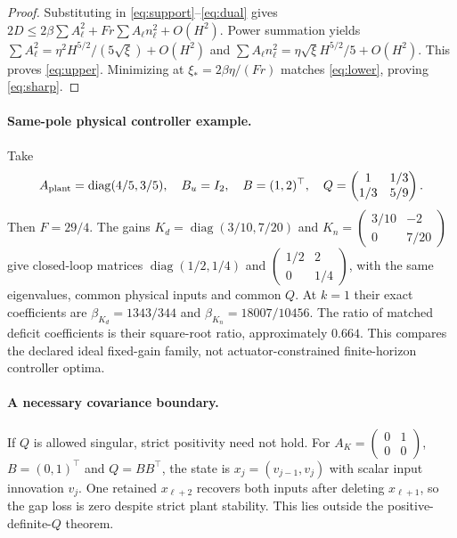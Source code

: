 \documentclass[11pt]{article}
\begin{document}
\begin{proof}
Substituting in \eqref{eq:support}--\eqref{eq:dual} gives
$2D\le2\beta\sum A_\ell^2+Fr\sum A_\ell n_\ell^2+O(H^2)$.
Power summation yields
$\sum A_\ell^2=\eta^2H^{5/2}/(5\sqrt\xi)+O(H^2)$ and
$\sum A_\ell n_\ell^2=\eta\sqrt\xi H^{5/2}/5+O(H^2)$.
This proves \eqref{eq:upper}. Minimizing at
$\xi_*=2\beta\eta/(Fr)$ matches \eqref{eq:lower}, proving \eqref{eq:sharp}.
\end{proof}

\paragraph{Same-pole physical controller example.}
Take
\[
A_{\rm plant}=\operatorname{diag}(4/5,3/5),\quad B_u=I_2,\quad
B=(1,2)^\top,\quad
Q=\begin{pmatrix}1&1/3\\1/3&5/9\end{pmatrix}.
\]
Then $F=29/4$.
The gains $K_d=\operatorname{diag}(3/10,7/20)$ and
$K_n=\left(\begin{smallmatrix}3/10&-2\\0&7/20\end{smallmatrix}\right)$
give closed-loop matrices
$\operatorname{diag}(1/2,1/4)$ and
$\left(\begin{smallmatrix}1/2&2\\0&1/4\end{smallmatrix}\right)$,
with the same eigenvalues, common physical inputs and common $Q$.
At $k=1$ their exact coefficients are
$\beta_{K_d}=1343/344$ and $\beta_{K_n}=18007/10456$.
The ratio of matched deficit coefficients is their square-root ratio,
approximately $0.664$.
This compares the declared ideal fixed-gain family, not actuator-constrained
finite-horizon controller optima.

\paragraph{A necessary covariance boundary.}
If $Q$ is allowed singular, strict positivity need not hold.
For $A_K=\left(\begin{smallmatrix}0&1\\0&0\end{smallmatrix}\right)$,
$B=(0,1)^\top$ and $Q=BB^\top$, the state is
$x_j=(v_{j-1},v_j)$ with scalar input innovation $v_j$.
One retained $x_{\ell+2}$ recovers both inputs after deleting $x_{\ell+1}$,
so the gap loss is zero despite strict plant stability.
This lies outside the positive-definite-$Q$ theorem.
\end{document}
